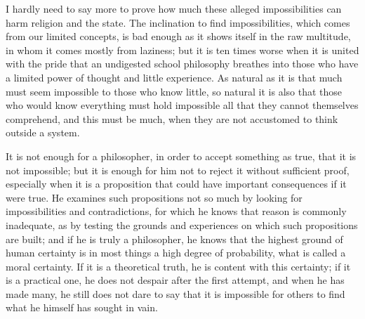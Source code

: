 \documentclass[12pt,a4paper,openany]{book}
\newcommand{\opage}[1]{\marginnote{\footnotesize\textit{[#1]}}}
\begin{document}
I hardly need to say more to prove how much these alleged impossibilities can
harm religion and the state. The inclination to find impossibilities, which comes
from our limited concepts, is bad enough as it shows itself in the raw multitude,
in whom it comes mostly from laziness; but it is ten times worse when it is
united with the pride that an undigested school philosophy breathes into those who
have a limited power of thought and little experience. As natural as it is that
much must seem impossible to those who know little, so natural it is also that
those
\setcounter{footnote}{0}%
\opage{34}who would know everything must hold impossible all that they cannot
themselves comprehend, and this must be much, when they are not accustomed to
think outside a system.

It is not enough for a philosopher, in order to accept something as true, that it
is not impossible; but it is enough for him not to reject it without sufficient
proof, especially when it is a proposition that could have important consequences
if it were true. He examines such propositions not so much by looking for
impossibilities and contradictions, for which he knows that reason is commonly
inadequate, as by testing the grounds and experiences on which such propositions
are built; and if he is truly a philosopher, he knows that the highest ground of
human certainty is in most things a high degree of probability, what is called a
moral certainty. If it is a theoretical truth, he is content with this certainty;
if it is a practical one, he does not despair after the first attempt, and when
he has made many, he still does not dare to say that it is impossible for others
to find what he himself has sought in vain.
\end{document}

